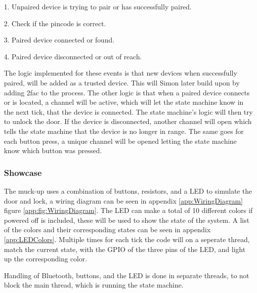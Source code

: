 1. Unpaired device is trying to pair or has successfully paired.

2. Check if the pincode is correct.

3. Paired device connected or found.

4. Paired device disconnected or out of reach.
\newline

The logic implemented for these events is that new devices when successfully paired, will be added as a trusted device.
This will Simon later build upon by adding 2fac to the process.
The other logic is that when a paired device connects or is located, a channel will be active, which will let the state machine know in the next tick, that the device is connected.
The state machine's logic will then try to unlock the door.
If the device is disconnected, another channel will open which tells the state machine that the device is no longer in range.
The same goes for each button press, a unique channel will be opened letting the state machine know which button was pressed.

\subsubsection{Showcase}
The muck-up uses a combination of buttons, resistors, and a LED to simulate the door and lock, a wiring diagram can be seen in appendix \ref{app:WiringDiagram} figure \ref{app:fig:WiringDiagram}.
The LED can make a total of 10 different colors if powered off is included,  these will be used to show the state of the system.
A list of the colors and their corresponding states can be seen in appendix \ref{app:LEDColors}.
Multiple times for each tick the code will on a seperate thread, match the current state, with the GPIO of the three pins of the LED, and light up the corresponding color.

Handling of Bluetooth, buttons, and the LED is done in separate threads, to not block the main thread, which is running the state machine.